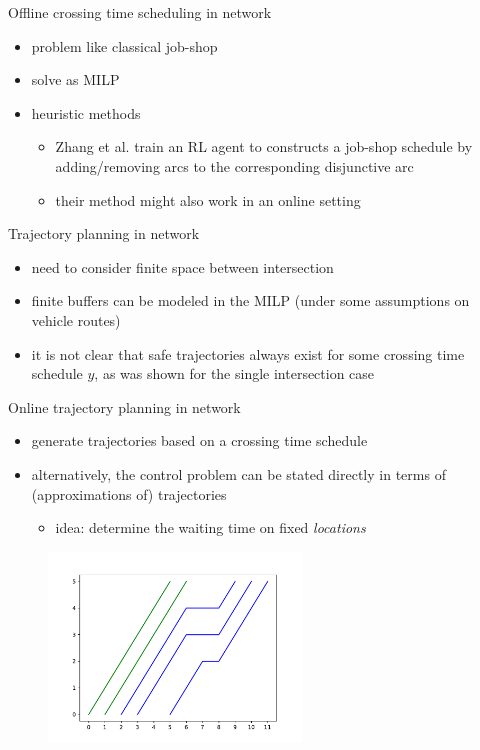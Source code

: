 \documentclass[bigger]{beamer}
\begin{document}
\begin{frame}[label={sec:org8eb72e4}]{Offline crossing time scheduling in network}
\begin{itemize}
\item problem like classical job-shop
\item solve as MILP
\item heuristic methods
\begin{itemize}
\item Zhang et al. train an RL agent to constructs a job-shop schedule by
adding/removing arcs to the corresponding disjunctive arc
\item their method might also work in an online setting
\end{itemize}
\end{itemize}
\end{frame}
\begin{frame}[label={sec:orgb48ad04}]{Trajectory planning in network}
\begin{itemize}
\item need to consider finite space between intersection
\item finite buffers can be modeled in the MILP (under some assumptions on vehicle routes)

\vfill
\item it is not clear that safe trajectories always exist for some crossing time
schedule \(y\), as was shown for the single intersection case
\end{itemize}
\end{frame}
\begin{frame}[label={sec:orgaebe8b7}]{Online trajectory planning in network}
\begin{itemize}
\item generate trajectories based on a crossing time schedule

\vfill
\item alternatively, the control problem can be stated directly in terms of
(approximations of) trajectories
\begin{itemize}
\item idea: determine the waiting time on fixed \emph{locations}
\end{itemize}
\end{itemize}

\begin{figure}
  \centering
  \includegraphics[width=0.6\textwidth]{figures/finite-buffer-schedule.pdf}
\end{figure}
\end{frame}
\end{document}
